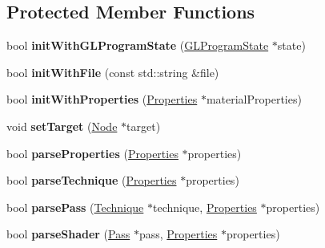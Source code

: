 \subsection*{Protected Member Functions}
\begin{DoxyCompactItemize}
\item 
\mbox{\label{classMaterial_a2cdb607bb32f8a27d55d88c067e8f2a8}} 
bool {\bfseries init\+With\+G\+L\+Program\+State} (\hyperlink{classGLProgramState}{G\+L\+Program\+State} $\ast$state)
\item 
\mbox{\label{classMaterial_ac800c5d49cbb8ebc101b690a65cfc1b7}} 
bool {\bfseries init\+With\+File} (const std\+::string \&file)
\item 
\mbox{\label{classMaterial_a34e5a31eb938ea98e542aad8bbd4e891}} 
bool {\bfseries init\+With\+Properties} (\hyperlink{classProperties}{Properties} $\ast$material\+Properties)
\item 
\mbox{\label{classMaterial_ac95e0062cfe6878550338818e96e1a8c}} 
void {\bfseries set\+Target} (\hyperlink{classNode}{Node} $\ast$target)
\item 
\mbox{\label{classMaterial_a4e6aa8011cfd995e0601b4ec6a059d8f}} 
bool {\bfseries parse\+Properties} (\hyperlink{classProperties}{Properties} $\ast$properties)
\item 
\mbox{\label{classMaterial_a89d534b505198eeedf69511d134a0dec}} 
bool {\bfseries parse\+Technique} (\hyperlink{classProperties}{Properties} $\ast$properties)
\item 
\mbox{\label{classMaterial_aaf062af5584ee89e97aa2ef590650eaa}} 
bool {\bfseries parse\+Pass} (\hyperlink{classTechnique}{Technique} $\ast$technique, \hyperlink{classProperties}{Properties} $\ast$properties)
\item 
\mbox{\label{classMaterial_ad880cfddfc8aba2c07ce8f28962d4818}} 
bool {\bfseries parse\+Shader} (\hyperlink{classPass}{Pass} $\ast$pass, \hyperlink{classProperties}{Properties} $\ast$properties)
\item 
\mbox{\label{classMaterial_ad6e8d499129cc4e8ebfa5ab9554caacd}} 

\end{DoxyCompactItemize}
